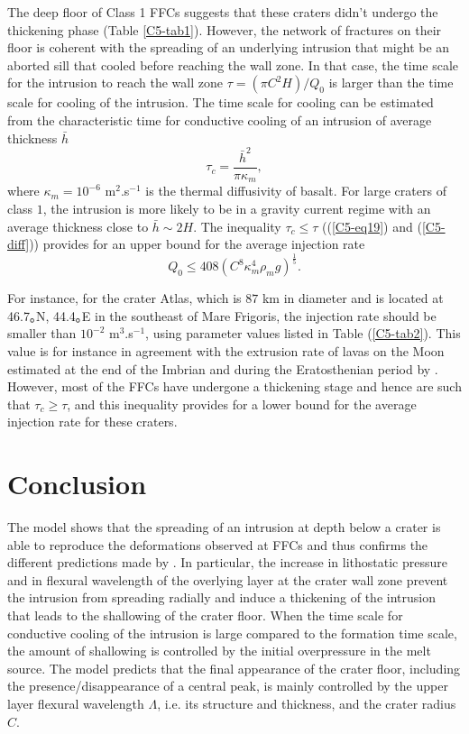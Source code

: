 The deep  floor of  Class 1  FFCs suggests  that these  craters didn't
undergo  the thickening  phase  (Table  \ref{C5-tab1}).  However,  the
network of fractures on their floor  is coherent with the spreading of
an  underlying intrusion  that might  be an  aborted sill  that cooled
before reaching the  wall zone.  In that case, the  time scale for the
intrusion to  reach the wall  zone $\tau=(\pi C^2 H)/Q_{0}$  is larger
than the time scale for cooling  of the intrusion.  The time scale for
cooling can be  estimated from the characteristic  time for conductive
cooling of an intrusion of average thickness $\bar{h}$
\begin{equation}
  \tau_{c}= \frac{\bar{h}^{2}}{\pi\kappa_m},
  \label{C5-diff}
\end{equation}
where $\kappa_m=10^{-6}$ m$^{2}$.s$^{-1}$ is  the thermal diffusivity of
basalt. For large  craters of class $1$, the intrusion  is more likely
to be in  a gravity current regime with an  average thickness close to
$\bar{h}\sim2H$.  The inequality  $\tau_{c} \le \tau$ ((\ref{C5-eq19})
and  (\ref{C5-diff})) provides  for  an upper  bound  for the  average
injection rate
\begin{equation}
  Q_{0}\le408 (C^{8}\kappa_m^{4}\rho_{m}g)^{\frac{1}{5}}.
  \label{C5-eq5-3}
\end{equation}

For instance, for  the crater Atlas, which is $87$  km in diameter and
is located  at 46.7｡N, 44.4｡E in  the southeast of Mare  Frigoris, the
injection  rate should  be  smaller  than $10^{-2}$  m$^{3}$.s$^{-1}$,
using parameter values listed in  Table (\ref{C5-tab2}). This value is
for instance in agreement with the extrusion rate of lavas on the Moon
estimated  at the  end of  the  Imbrian and  during the  Eratosthenian
period  by  \citet{Head:1992bk}.   However,  most  of  the  FFCs  have
undergone   a    thickening   stage   and   hence    are   such   that
$\tau_{c} \ge  \tau$, and this  inequality provides for a  lower bound
for the average injection rate for these craters.
 		
\section{Conclusion}
		
The model  shows that the spreading  of an intrusion at  depth below a
crater is able to reproduce the deformations observed at FFCs and thus
confirms the different predictions made by \citet{Schultz:1976kt}.  In
particular,  the  increase in  lithostatic  pressure  and in  flexural
wavelength of the overlying layer at  the crater wall zone prevent the
intrusion  from spreading  radially  and induce  a  thickening of  the
intrusion that leads  to the shallowing of the crater  floor. When the
time scale for  conductive cooling of the intrusion  is large compared
to the formation time scale, the amount of shallowing is controlled by
the initial overpressure  in the melt source. The  model predicts that
the   final   appearance   of   the  crater   floor,   including   the
presence/disappearance of a central peak,  is mainly controlled by the
upper  layer flexural  wavelength $\Lambda$,  i.e.  its  structure and
thickness, and the crater radius $C$.
	
